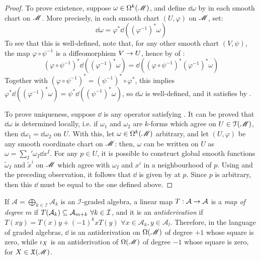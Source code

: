 \begin{proofbox}
  \begin{proof}
    To prove existence, suppose $ \omega \in \Omega^{k}(\mathscr{M}) $, and define $ \dd \omega $ by  in each smooth chart on $ \mathscr{M} $. More precisely, in each smooth chart $ (U,\varphi) $ on $ \mathscr{M} $, set:
    \begin{equation*}
      \dd \omega = \varphi^* \dd ((\varphi^{-1})^* \omega)
    \end{equation*}
    To see that this is well-defined, note that, for any other smooth chart $ (V,\psi) $, the map $ \varphi \circ \psi^{-1} $ is a diffeomorphism $ V \rightarrow U $, hence by  of :
    \begin{equation*}
      (\varphi \circ \psi^{-1})^* \dd ((\varphi^{-1})^* \omega) = \dd ((\varphi \circ \psi^{-1})^* (\varphi^{-1})^* \omega)
    \end{equation*}
    Together with $ (\varphi \circ \psi^{-1})^* = (\psi^{-1})^* \circ \varphi^* $, this implies $ \varphi^* \dd ((\varphi^{-1})^* \omega) = \psi^* \dd ((\psi^{-1})^* \omega) $, so $ \dd \omega $ is well-defined, and it satisfies  by .

    To prove uniqueness, suppose $ \dd $ is any operator satisfying . It can be proved that $ \dd \omega $ is determined locally, i.e. if $ \omega_1 $ and $ \omega_2 $ are $ k $-forms which agree on $ U \in \EuScript{T}(\mathscr{M}) $, then $ \dd \omega_1 = \dd \omega_2 $ on $ U $. With this, let $ \omega \in \Omega^{k}(\mathscr{M}) $ arbitrary, and let $ (U,\varphi) $ be any smooth coordinate chart on $ \mathscr{M} $: then, $ \omega $ can be written on $ U $ as $ \omega = {\sum_I}' \omega_I \dd x^I $. For any $ p \in U $, it is possible to construct global smooth functions $ \tilde{\omega}_I $ and $ \tilde{x}^i $ on $ \mathscr{M} $ which agree with $ \omega_I $ and $ x^i $ in a neighbourhood of $ p $. Using  and the preceding observation, it follows that $ \dd $ is given by  at $ p $. Since $ p $ is arbitrary, then this $ \dd $ must be equal to the one defined above.
  \end{proof}
\end{proofbox}

If $ \mathcal{A} = \bigoplus_{k \in \mathcal{I}} \mathcal{A}_k $ is an $ \mathcal{I} $-graded algebra, a linear map $ T : \mathcal{A} \rightarrow \mathcal{A} $ is a \emph{map of degree $ m $} if $ T(\mathcal{A}_k) \subseteq \mathcal{A}_{m+k} \,\,\forall k \in \mathcal{I} $, and it is an \emph{antiderivation} if $ T(xy) = T(x) y+ (-1)^k x T(y) \,\,\forall x \in \mathcal{A}_k , y \in \mathcal{A}_l $. Therefore, in the language of graded algebras, $ \dd $ is an antiderivation on $ \Omega(\mathscr{M}) $ of degree $ +1 $ whose square is zero, while $ \iota_X $ is an antiderivation of $ \Omega(\mathscr{M}) $ of degree $ -1 $ whose square is zero, for $ X \in \mathfrak{X}(\mathscr{M}) $.


